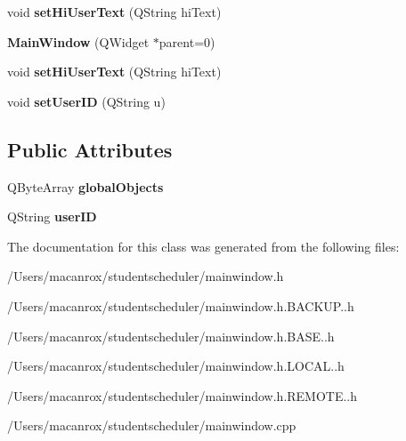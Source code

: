 \begin{DoxyCompactItemize}
\item 
\hypertarget{class_main_window_ab1d0cc488a9fcaa215e13413e05d20a3}{void {\bfseries set\-Hi\-User\-Text} (Q\-String hi\-Text)}\label{class_main_window_ab1d0cc488a9fcaa215e13413e05d20a3}

\item 
\hypertarget{class_main_window_a8b244be8b7b7db1b08de2a2acb9409db}{{\bfseries Main\-Window} (Q\-Widget $\ast$parent=0)}\label{class_main_window_a8b244be8b7b7db1b08de2a2acb9409db}

\item 
\hypertarget{class_main_window_ab1d0cc488a9fcaa215e13413e05d20a3}{void {\bfseries set\-Hi\-User\-Text} (Q\-String hi\-Text)}\label{class_main_window_ab1d0cc488a9fcaa215e13413e05d20a3}

\item 
\hypertarget{class_main_window_a348aac0acc219ec317294308f6fa618b}{void {\bfseries set\-User\-I\-D} (Q\-String u)}\label{class_main_window_a348aac0acc219ec317294308f6fa618b}

\end{DoxyCompactItemize}
\subsection*{Public Attributes}
\begin{DoxyCompactItemize}
\item 
\hypertarget{class_main_window_a9f66bfa4a75719a5045fbd4f1af616cf}{Q\-Byte\-Array {\bfseries global\-Objects}}\label{class_main_window_a9f66bfa4a75719a5045fbd4f1af616cf}

\item 
\hypertarget{class_main_window_a47496802a6ea3712bcdbe86aacbfe63e}{Q\-String {\bfseries user\-I\-D}}\label{class_main_window_a47496802a6ea3712bcdbe86aacbfe63e}

\end{DoxyCompactItemize}


The documentation for this class was generated from the following files\-:\begin{DoxyCompactItemize}
\item 
/\-Users/macanrox/studentscheduler/mainwindow.\-h\item 
/\-Users/macanrox/studentscheduler/mainwindow.\-h.\-B\-A\-C\-K\-U\-P..\-h\item 
/\-Users/macanrox/studentscheduler/mainwindow.\-h.\-B\-A\-S\-E..\-h\item 
/\-Users/macanrox/studentscheduler/mainwindow.\-h.\-L\-O\-C\-A\-L..\-h\item 
/\-Users/macanrox/studentscheduler/mainwindow.\-h.\-R\-E\-M\-O\-T\-E..\-h\item 
/\-Users/macanrox/studentscheduler/mainwindow.\-cpp\end{DoxyCompactItemize}

